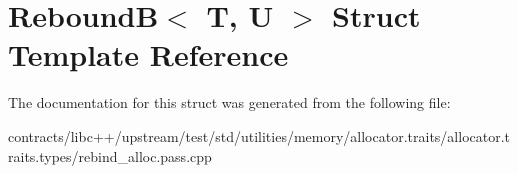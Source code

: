 \hypertarget{struct_rebound_b}{}\section{ReboundB$<$ T, U $>$ Struct Template Reference}
\label{struct_rebound_b}


The documentation for this struct was generated from the following file\+:\begin{DoxyCompactItemize}
\item 
contracts/libc++/upstream/test/std/utilities/memory/allocator.\+traits/allocator.\+traits.\+types/rebind\+\_\+alloc.\+pass.\+cpp\end{DoxyCompactItemize}
